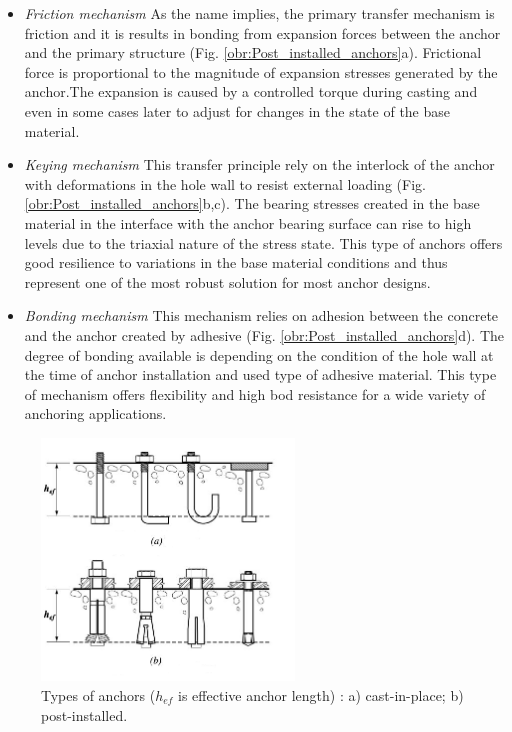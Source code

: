 \begin{itemize}
	\item \textit{Friction mechanism}
	As the name implies, the primary transfer mechanism is friction and it is results in bonding from expansion forces between the anchor and the primary structure (Fig. \ref{obr:Post_installed_anchors}a). Frictional force is proportional to the magnitude of expansion stresses generated by the anchor.The expansion is caused by a controlled torque during casting and even in some cases later to adjust for changes in the state of the base material.
	
	\item \textit{Keying mechanism}
	This transfer principle rely on the interlock of the anchor with deformations in the hole wall to resist external loading (Fig. \ref{obr:Post_installed_anchors}b,c). The bearing stresses created in the base material in the interface with the anchor bearing surface can rise to high levels due to the triaxial nature of the stress state. This type of anchors offers good resilience to variations in the base material conditions and thus represent one of the most robust solution for most anchor designs. 
	
	\item \textit{Bonding mechanism}
	This mechanism relies on adhesion between the concrete and the anchor created by adhesive (Fig. \ref{obr:Post_installed_anchors}d). The degree of bonding available is depending on the condition of the hole wall at the time of anchor installation and used type of adhesive material. This type of mechanism offers flexibility and high bod resistance for a wide variety of anchoring applications. 
\end{itemize}

\begin{figure}[h!] 
	\centering 
	\includegraphics[width=0.6\textwidth]{obrazky/anchor_types_repaired.png} 
	\caption[Types of anchors]{Types of anchors ($h_{ef}$ is effective anchor length) \cite{anchors-ACI-318M}: a) cast-in-place; b) post-installed.}\label{obr:Anchors} 
\end{figure} 


